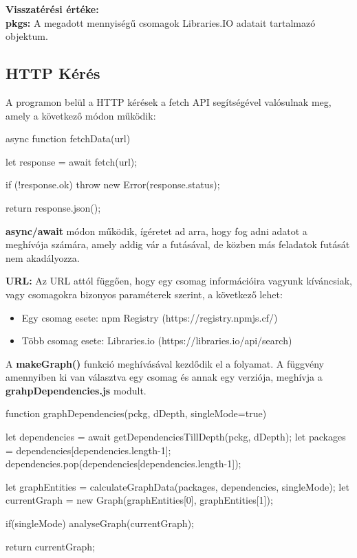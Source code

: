 \noindent \textbf{Visszatérési értéke:} \\

\textbf{pkgs:} A megadott mennyiségű csomagok Libraries.IO adatait tartalmazó objektum.\\
\pagebreak

\subsection{HTTP Kérés}

A programon belül a HTTP kérések a fetch API segítségével valósulnak meg, amely a következő módon működik:

\begin{js}
async function fetchData(url){
	let response = await fetch(url);
	
	if (!response.ok) {
		throw new Error(response.status);
	}
	
	return response.json();
}
\end{js}

\textbf{async/await} módon működik, ígéretet ad arra, hogy fog adni adatot a meghívója számára, amely addig vár a futásával, de közben más feladatok futását nem akadályozza.

\textbf{URL:} Az URL attól függően, hogy egy csomag információira vagyunk kíváncsiak, vagy csomagokra bizonyos paraméterek szerint, a következő lehet:
\begin{itemize}
	\item Egy csomag esete: npm Registry (https://registry.npmjs.cf/)
	\item Több csomag esete: Libraries.io (https://libraries.io/api/search)
\end{itemize} 


A \textbf{makeGraph()} funkció meghívásával kezdődik el a folyamat. A függvény amennyiben ki van választva egy csomag és annak egy verziója, meghívja a \textbf {grahpDependencies.js} modult. 

\begin{js}
function graphDependencies(pckg, dDepth, singleMode=true){
	
	let dependencies = await getDependenciesTillDepth(pckg, dDepth);
	let packages = dependencies[dependencies.length-1];
	dependencies.pop(dependencies[dependencies.length-1]);
	
	let graphEntities = 
		calculateGraphData(packages, dependencies, singleMode);
	let currentGraph = 
		new Graph(graphEntities[0], graphEntities[1]);
	
	if(singleMode){
		analyseGraph(currentGraph);
	}
	
	return currentGraph;
}	
\end{js}

